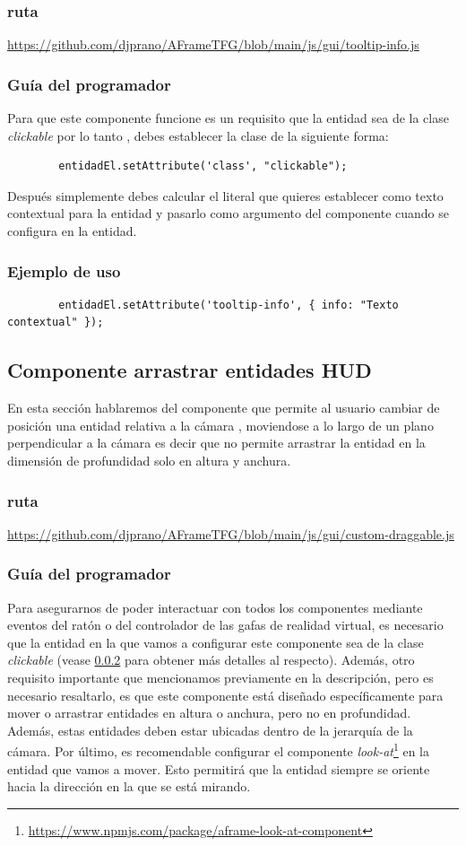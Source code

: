 \documentclass[a4paper, 11pt]{book}
\begin{document}
\subsubsection{ruta}
{\scriptsize
	\url{https://github.com/djprano/AFrameTFG/blob/main/js/gui/tooltip-info.js}
}

\subsubsection{Guía del programador}
\label{subsub:clickable}
Para que este componente funcione es un requisito que la entidad sea de la clase \emph{clickable} por lo tanto , debes establecer la clase de la siguiente forma:
{\scriptsize
	\begin{verbatim}
		entidadEl.setAttribute('class', "clickable");
	\end{verbatim}
}
Después simplemente debes calcular el literal que quieres establecer como texto contextual para la entidad y pasarlo como argumento del componente cuando se configura en la entidad.
\subsubsection{Ejemplo de uso}
{\scriptsize
	\begin{verbatim}
		entidadEl.setAttribute('tooltip-info', { info: "Texto contextual" });
	\end{verbatim}
}

\subsection{Componente arrastrar entidades HUD}
En esta sección hablaremos del componente que permite al usuario cambiar de posición una entidad relativa a la cámara , moviendose a lo largo de un plano perpendicular a la cámara es decir que no permite arrastrar la entidad en la dimensión de profundidad solo en altura y anchura. 
\subsubsection{ruta}
{\scriptsize
	\url{https://github.com/djprano/AFrameTFG/blob/main/js/gui/custom-draggable.js}
}
\subsubsection{Guía del programador}
Para asegurarnos de poder interactuar con todos los componentes mediante eventos del ratón o del controlador de las gafas de realidad virtual, es necesario que la entidad en la que vamos a configurar este componente sea de la clase \emph{clickable} (vease  \ref{subsub:clickable} para obtener más detalles al respecto).
Además, otro requisito importante que mencionamos previamente en la descripción, pero es necesario resaltarlo, es que este componente está diseñado específicamente para mover o arrastrar entidades en altura o anchura, pero no en profundidad. Además, estas entidades deben estar ubicadas dentro de la jerarquía de la cámara.
Por último, es recomendable configurar el componente \emph{look-at}\footnote{\url{https://www.npmjs.com/package/aframe-look-at-component}} en la entidad que vamos a mover. Esto permitirá que la entidad siempre se oriente hacia la dirección en la que se está mirando.
\end{document}

